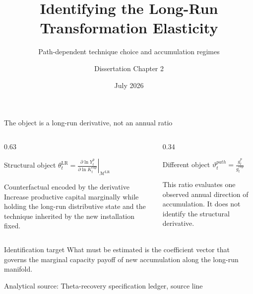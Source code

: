 \documentclass[10pt,aspectratio=169]{beamer}
\title[Identifying long-run $\theta_t$]{Identifying the Long-Run Transformation Elasticity}
\subtitle{Path-dependent technique choice and accumulation regimes}
\author{Dissertation Chapter 2}
\date{July 2026}
\newcommand{\LR}{\mathrm{LR}}
\newcommand{\sourcefooter}[1]{%
  \par\vfill{\tiny\color{gray!70}Analytical source: #1}\vspace{-0.35em}}
\begin{document}
\begin{frame}{The object is a long-run derivative, not an annual ratio}
  \begin{columns}[T,onlytextwidth]
    \begin{column}{0.63\textwidth}
      \begin{block}{Structural object}
        \centering
        \Large
        $\displaystyle
        \theta_t^{\LR}
        =
        \left.
        \frac{\partial\ln Y_t^p}{\partial\ln K_t^{cap}}
        \right|_{\mathcal M^{\LR}}$
      \end{block}
      \begin{block}{Counterfactual encoded by the derivative}
        Increase productive capital marginally while holding the long-run distributive state and the technique inherited by the new installation fixed.
      \end{block}
    \end{column}
    \begin{column}{0.34\textwidth}
      \begin{alertblock}{Different object}
        \centering
        \Large $\displaystyle \vartheta_t^{path}=\frac{g_t^p}{g_t^{cap}}$

        \vspace{0.6em}\normalsize
        This ratio evaluates one observed annual direction of accumulation. It does not identify the structural derivative.
      \end{alertblock}
    \end{column}
  \end{columns}
  \begin{block}{Identification target}
    What must be estimated is the coefficient vector that governs the marginal capacity payoff of new accumulation along the long-run manifold.
  \end{block}
  \sourcefooter{Theta-recovery specification ledger, source line \LineThetaObject}
\end{frame}
\end{document}

